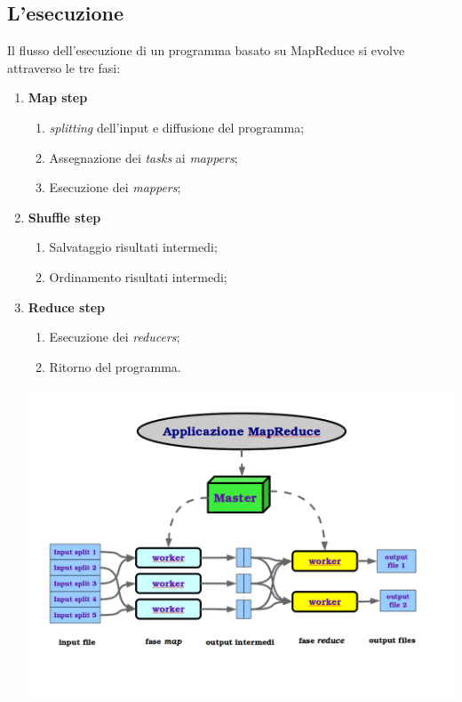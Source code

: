 \documentclass[a4paper,11pt]{report}
\begin{document}
\subsection{L'esecuzione} 
Il flusso dell'esecuzione di un programma basato su MapReduce si evolve attraverso le tre fasi:
\begin{enumerate}
 \item \textbf{Map step}
  \begin{enumerate}
   \item \emph{splitting} dell'input e diffusione del programma;
  \item Assegnazione dei \emph{tasks} ai \emph{mappers};
  \item Esecuzione dei \emph{mappers};
  \end{enumerate}
 \item \textbf{Shuffle step}
  \begin{enumerate}
   \item Salvataggio risultati intermedi;
  \item Ordinamento risultati intermedi;
  \end{enumerate}
  \item \textbf{Reduce step}
  \begin{enumerate}
  \item Esecuzione dei \emph{reducers};
  \item Ritorno del programma.
  \end{enumerate}
\paragraph{}
\centerline{\includegraphics[width=170mm]{images/flusso-esecuzione-map-reduce.png}}

  
\end{enumerate}
\end{document}
